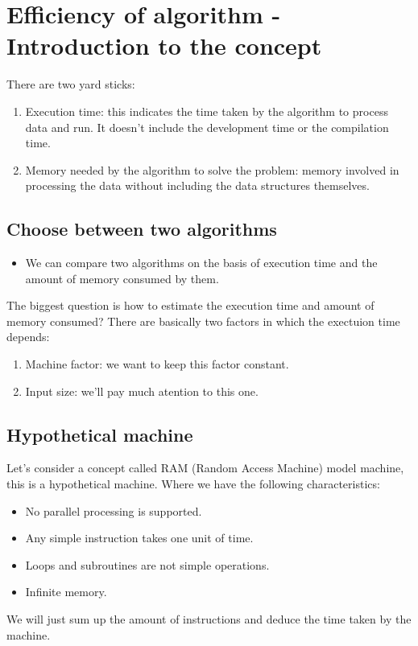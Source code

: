 \section{Efficiency of algorithm - Introduction to the concept}
There are two yard sticks:
\begin{enumerate}
    \item Execution time: this indicates the time taken by the algorithm to process data and run. It doesn't include the development time or the compilation time. 
    \item Memory needed by the algorithm to solve the problem: memory involved in processing the data without including the data structures themselves.
\end{enumerate}

\subsection{Choose between two algorithms}
\begin{itemize}
    \item We can compare two algorithms on the basis of execution time and the amount of memory consumed by them.
\end{itemize}
The biggest question is how to estimate the execution time and amount of memory consumed? There are basically two factors in which the exectuion time depends:
\begin{enumerate}
    \item Machine factor: we want to keep this factor constant. 
    \item Input size: we'll pay much atention to this one. 
\end{enumerate}

\subsection{Hypothetical machine}
Let's consider a concept called RAM (Random Access Machine) model machine, this is a hypothetical machine. Where we have the following characteristics:
\begin{itemize}
    \item No parallel processing is supported. 
    \item Any simple instruction takes one unit of time. 
    \item Loops and subroutines are not simple operations. 
    \item Infinite memory. 
\end{itemize}
We will just sum up the amount of instructions and deduce the time taken by the machine. 

